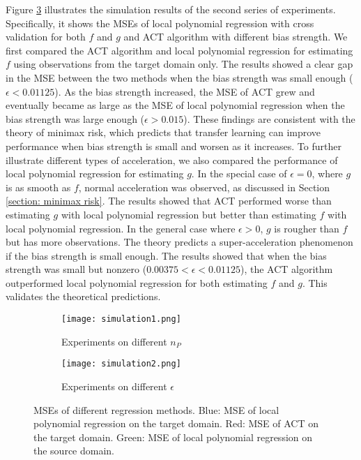 \documentclass{article}
\begin{document}
Figure \ref{figure: simulation2} illustrates the simulation results of the second series of experiments. Specifically, it shows the MSEs of local polynomial regression with cross validation for both $f$ and $g$ and ACT algorithm with different bias strength. 
We first compared the ACT algorithm and local polynomial regression for estimating $f$ using observations from the target domain only. The results showed a clear gap in the MSE between the two methods when the bias strength was small enough ($\epsilon<0.01125$). As the bias strength increased, the MSE of ACT grew and eventually became as large as the MSE of local polynomial regression when the bias strength was large enough ($\epsilon>0.015$). These findings are consistent with the theory of minimax risk, which predicts that transfer learning can improve performance when bias strength is small and worsen as it increases. To further illustrate different types of acceleration, we also compared the performance of local polynomial regression for estimating $g$. In the special case of $\epsilon=0$, where $g$ is as smooth as $f$, normal acceleration was observed, as discussed in Section \ref{section: minimax risk}. The results showed that ACT performed worse than estimating $g$ with local polynomial regression but better than estimating $f$ with local polynomial regression. In the general case where $\epsilon>0$, $g$ is rougher than $f$ but has more observations. The theory predicts a super-acceleration phenomenon if the bias strength is small enough. The results showed that when the bias strength was small but nonzero ($0.00375<\epsilon<0.01125$), the ACT algorithm outperformed local polynomial regression for both estimating $f$ and $g$. This validates the theoretical predictions.

\begin{figure}[ht]
    \begin{subfigure}[b]{0.47\textwidth}
      \texttt{[image: simulation1.png]}
      \caption{Experiments on different $n_P$}\label{figure: simulation1}
    \end{subfigure}
    \begin{subfigure}[b]{0.48\textwidth}
      \texttt{[image: simulation2.png]}
      \caption{Experiments on different $\epsilon$}\label{figure: simulation2}
    \end{subfigure}
    \caption{MSEs of different regression methods. Blue: MSE of local polynomial regression on the target domain. Red: MSE of ACT on the target domain. Green: MSE of local polynomial regression on the source domain.}
  \end{figure}
\end{document}
